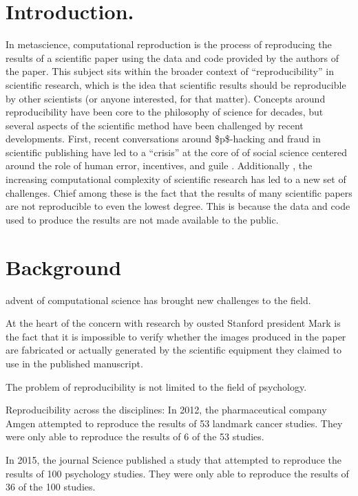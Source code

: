 
\hypertarget{introduction.}{%
\section{Introduction.}\label{introduction.}}

In metascience, computational reproduction is the process of reproducing the results of a scientific paper using the data and code provided by the authors of the paper. This subject sits within the broader context of ``reproducibility'' in scientific  research, which is the idea that scientific results should be reproducible by other scientists (or anyone interested, for that matter). Concepts around reproducibility have been core to the philosophy of science for decades, but several aspects of the scientific method have been challenged by recent developments. 
First, recent conversations around \$p\$-hacking and fraud in scientific publishing have led to a ``crisis'' at the core of of social science centered around the role of human error, incentives, and guile    . 
Additionally , the increasing computational complexity of scientific research has led to a new set of challenges. Chief among these is the fact that the results of many scientific papers are not reproducible to even the lowest degree. This is because the data and code used to produce the results are not made available to the public.


\hypertarget{background}{%
\section{Background}\label{background}}

advent of computational science has brought new challenges to the field.

At the heart of the concern with research by ousted Stanford president Mark is the fact that it is impossible to verify whether the images produced in the paper are fabricated or actually generated by the scientific equipment they claimed to use in the published manuscript.

The problem of reproducibility is not limited to the field of psychology. 

Reproducibility across the disciplines:
In 2012, the pharmaceutical company Amgen attempted to reproduce the results of 53 landmark cancer studies. They were only able to reproduce the results of 6 of the 53 studies.

In 2015, the journal Science published a study that attempted to reproduce the results of 100 psychology studies. They were only able to reproduce the results of 36 of the 100 studies.

